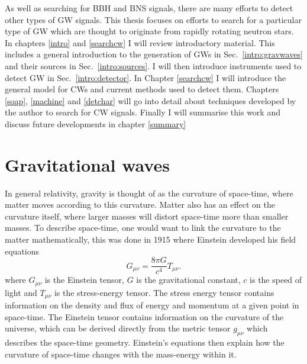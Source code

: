 As well as searching for \gls{BBH} and \gls{BNS} signals, there are many
efforts to detect other types of \gls{GW} signals.  This thesis focuses on
efforts to search for a particular type of \gls{GW} which are thought to
originate from rapidly rotating neutron stars.  In chapters \ref{intro} and
\ref{searchcw} I will review introductory material.  This includes a general
introduction to the generation of \glspl{GW} in Sec.~\ref{intro:gravwaves} and
their sources in Sec.~\ref{intro:sources}.  I will then introduce instruments
used to detect \gls{GW} in Sec.~\ref{intro:detector}.  In Chapter
\ref{searchcw} I will introduce the general model for \glspl{CW} and current
methods used to detect them.  Chapters \ref{soap}, \ref{machine} and
\ref{detchar} will go into detail about techniques developed by the author to
search for \gls{CW} signals.  Finally I will summarise this work and discuss
future developments in chapter \ref{summary}
~

\section{\label{intro:gravwaves}Gravitational waves}

In general relativity, gravity is thought of as the curvature of space-time, where
matter moves according to this curvature. Matter also has
an effect on the curvature itself, where larger masses will distort space-time more than smaller masses. 
To describe space-time, one would want to link the curvature to the matter mathematically, this was done in 1915 \citep{einstein2005GrundlageAllgemeinen}  where Einstein developed his field equations
\begin{equation}
\label{intro:gravwaves:efe}
    G_{\mu \nu} = \frac{8 \pi G}{c^4}T_{\mu \nu}.
\end{equation}
where $G_{\mu \nu}$ is the Einstein tensor, $G$ is the gravitational constant, $c$ is the speed of light and $T_{\mu \nu}$ is the
stress-energy tensor.  The stress energy tensor contains information on the density and flux of energy and momentum at a given point in space-time.  
The Einstein tensor contains information on the curvature of the
universe, which can be derived directly from the metric tensor $g_{\mu \nu}$
which describes the space-time geometry.
Einstein's equations then explain how the curvature of space-time changes with
the mass-energy within it.  

